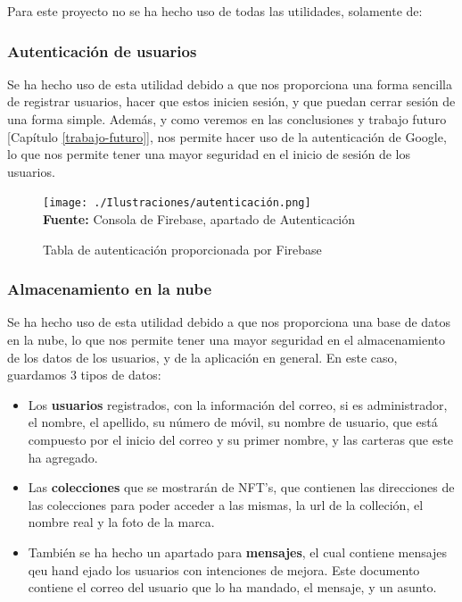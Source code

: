 Para este proyecto no se ha hecho uso de todas las utilidades, solamente de:

\subsubsection{Autenticación de usuarios}
\label{autenticacion} Se ha hecho uso de esta
utilidad debido a que nos proporciona una forma sencilla de registrar usuarios,
hacer que estos inicien sesión, y que puedan cerrar sesión de una forma simple.
Además, y como veremos en las conclusiones y trabajo futuro [Capítulo \ref{trabajo-futuro}],
nos permite hacer uso de la autenticación de Google, lo que nos permite tener
una mayor seguridad en el inicio de sesión de los usuarios.
\begin{figure}[htb!]
    \centering
    \caption{Tabla de autenticación proporcionada por Firebase}
    \label{fig:firebase-autenticacion}
    \centering
    \texttt{[image: ./Ilustraciones/autenticación.png]}\\
    \textbf{Fuente:} Consola de Firebase, apartado de Autenticación
\end{figure}
\hfill \break

\subsubsection{Almacenamiento en la nube}
\label{almacenamiento}
Se ha hecho uso de esta utilidad debido a que nos proporciona una base de datos
en la nube, lo que nos permite tener una mayor seguridad en el almacenamiento de
los datos de los usuarios, y de la aplicación en general.
En este caso, guardamos 3 tipos de datos:
\begin{itemize}
    \item Los \textbf{usuarios} registrados, con la información del correo, si es
          administrador, el nombre, el apellido, su número de móvil, su nombre de
          usuario, que está compuesto por el inicio del correo y su primer nombre, y las
          carteras que este ha agregado.
    \item Las \textbf{colecciones} que se mostrarán de NFT's, que contienen las
          direcciones de las colecciones para poder acceder a las mismas, la url de la
          colleción, el nombre real y la foto de la marca.
    \item También se ha hecho un apartado para \textbf{mensajes}, el cual contiene
          mensajes qeu hand ejado los usuarios con intenciones de mejora. Este documento
          contiene el correo del usuario que lo ha mandado, el mensaje, y un asunto.
\end{itemize}

